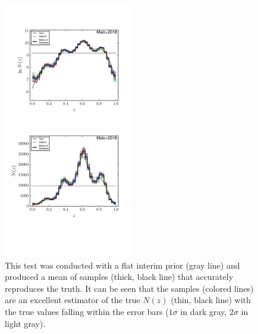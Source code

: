 \documentclass[preprint]{aastex}
\begin{document}
\begin{figure}
\includegraphics[width=0.5\textwidth]{figs/null/samps.pdf}
\caption{This test was conducted with a flat interim prior (gray line) and 
produced a mean of samples (thick, black line) that accurately reproduces the 
truth.  It can be seen that the samples (colored lines) are an excellent 
estimator of the true $N(z)$ (thin, black line) with the true values falling 
within the error bars ($1\sigma$ in dark gray, $2\sigma$ in light gray).}
\label{fig:null-samp}
\end{figure}
\end{document}
